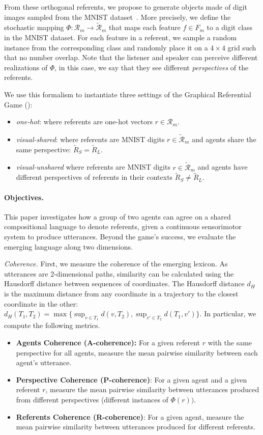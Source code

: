 From these orthogonal referents, we propose to generate objects made of digit images sampled from the MNIST dataset~\citep{LeCun1998GradientbasedLA}. More precisely, we define the stochastic mapping $\Phi: \mathcal{R}_m \rightarrow \tilde{\mathcal{R}}_m$ that maps each feature $f \in F_m$ to a digit class in the MNIST dataset. For each feature in a referent, we sample a random instance from the corresponding class and randomly place it on a $4\times4$ grid such that no number overlap. Note that the listener and speaker can perceive different realizations of $
\Phi$, in this case, we say that they see different \textit{perspectives} of the referents.

We use this formalism to instantiate three settings of the Graphical Referential Game (\greg):
\begin{itemize}[noitemsep,topsep=0pt]
    \item \textit{one-hot}: where referents are one-hot vectors $r \in \mathcal{R}_m$.
    \item \textit{visual-shared}: where referents are MNIST digits $r \in \tilde{\mathcal{R}}_m$ and agents share the same perspective: $\tilde{R}_S = \tilde{R}_L$.
    \item \textit{visual-unshared} where referents are MNIST digits $r \in \tilde{\mathcal{R}}_m$ and agents have different perspectives of referents in their contexts $\tilde{R}_S \neq \tilde{R}_L$.
\end{itemize}


\paragraph{Objectives.}
This paper investigates how a group of two agents can agree on a shared compositional language to denote referents, given a continuous sensorimotor system to produce utterances. Beyond the game's success, we evaluate the emerging language along two dimensions. 

\textit{Coherence. } First, we measure the coherence of the emerging lexicon. As utterances are 2-dimensional paths, similarity can be calculated using the Hausdorff distance between sequences of coordinates. The Hausdorff distance $d_H$ is the maximum distance from any coordinate in a trajectory to the closest coordinate in the other:
$d_H(T_1,T_2) = \max\{\sup_{v \in T_1} d(v,T_2), \sup_{v' \in T_2}d(T_1,v') \}$.
In particular, we compute the following metrics.
\begin{itemize}[noitemsep,topsep=0pt]
    \item \textbf{Agents Coherence (A-coherence):} For a given referent $r$ with the same perspective for all agents, measure the mean pairwise similarity between each agent's utterance.
    \item \textbf{Perspective Coherence (P-coherence)}: For a given agent and a given referent $r$, measure the mean pairwise similarity between utterances produced from different perspectives (different instances of $\Phi(r))$.
    \item \textbf{Referents Coherence (R-coherence)}: For a given agent, measure the mean pairwise similarity between utterances produced for different referents.
\end{itemize}

